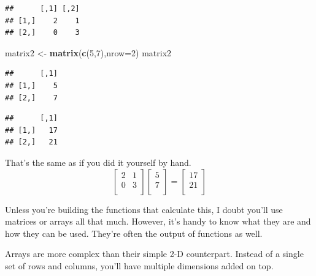 \documentclass[
]{book}
\newenvironment{Shaded}{\begin{snugshade}}{\end{snugshade}}
\newcommand{\CommentTok}[1]{\textcolor[rgb]{0.56,0.35,0.01}{\textit{#1}}}
\newcommand{\DataTypeTok}[1]{\textcolor[rgb]{0.13,0.29,0.53}{#1}}
\newcommand{\DecValTok}[1]{\textcolor[rgb]{0.00,0.00,0.81}{#1}}
\newcommand{\KeywordTok}[1]{\textcolor[rgb]{0.13,0.29,0.53}{\textbf{#1}}}
\newcommand{\NormalTok}[1]{#1}
\newcommand{\OperatorTok}[1]{\textcolor[rgb]{0.81,0.36,0.00}{\textbf{#1}}}
\newcommand{\StringTok}[1]{\textcolor[rgb]{0.31,0.60,0.02}{#1}}
\begin{document}
\begin{verbatim}
##      [,1] [,2]
## [1,]    2    1
## [2,]    0    3
\end{verbatim}

\begin{Shaded}
\begin{Highlighting}[]
\NormalTok{matrix2 <-}\StringTok{ }\KeywordTok{matrix}\NormalTok{(}\KeywordTok{c}\NormalTok{(}\DecValTok{5}\NormalTok{,}\DecValTok{7}\NormalTok{),}\DataTypeTok{nrow=}\DecValTok{2}\NormalTok{)}
\NormalTok{matrix2}
\end{Highlighting}
\end{Shaded}

\begin{verbatim}
##      [,1]
## [1,]    5
## [2,]    7
\end{verbatim}

\begin{Shaded}
\end{Shaded}

\begin{verbatim}
##      [,1]
## [1,]   17
## [2,]   21
\end{verbatim}

That's the same as if you did it yourself by hand.
\[
 \begin{bmatrix}
  2 & 1\\
  0 & 3 \\
 \end{bmatrix}
 \begin{bmatrix}
  5\\
  7\\
 \end{bmatrix}
 =
 \begin{bmatrix}
  17\\
  21\\
 \end{bmatrix} \]

Unless you're building the functions that calculate this, I doubt you'll use matrices or arrays all that much. However, it's handy to know what they are and how they can be used. They're often the output of functions as well.

Arrays are more complex than their simple 2-D counterpart. Instead of a single set of rows and columns, you'll have multiple dimensions added on top.
\end{document}
